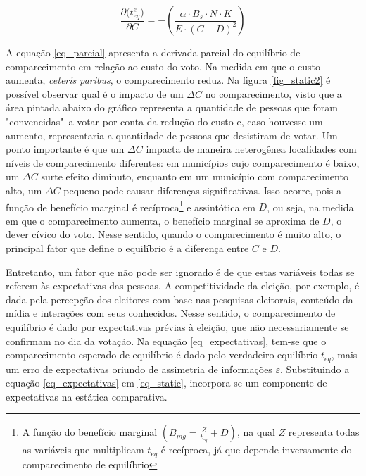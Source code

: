 % 
% 

\begin{equation}
\label{eq_parcial}
    \frac{\partial{(t_{eq}^e})}{\partial C} = -\left(\frac{\alpha\cdot B_s\cdot N\cdot K}{E\cdot (C-D)^2}\right)
\end{equation}

A equação \ref{eq_parcial} apresenta a derivada parcial do equilíbrio de comparecimento em relação ao custo do voto. Na medida em que o custo aumenta, \textit{ceteris paribus}, o comparecimento reduz. Na figura \ref{fig_static2} é possível observar qual é o impacto de um $\Delta C$ no comparecimento, visto que a área pintada abaixo do gráfico representa a quantidade de pessoas que foram "convencidas"\  a votar por conta da redução do custo e, caso houvesse um aumento, representaria a quantidade de pessoas que desistiram de votar. Um ponto importante é que um $\Delta C$ impacta de maneira heterogênea localidades com níveis de comparecimento diferentes: em municípios cujo comparecimento é baixo, um $\Delta C$ surte efeito diminuto, enquanto em um município com comparecimento alto, um $\Delta C$ pequeno pode causar diferenças significativas. Isso ocorre, pois a função de benefício marginal é recíproca\footnote{A função do benefício marginal $(B_{mg}=\frac{Z}{t_{eq}} + D)$, na qual $Z$ representa todas as variáveis que multiplicam $t_{eq}$ é recíproca, já que depende inversamente do comparecimento de equilíbrio} 
e assintótica em $D$, ou seja, na medida em que o comparecimento aumenta, o benefício marginal se aproxima de $D$, o dever cívico do voto. Nesse sentido, quando o comparecimento é muito alto, o principal fator que define o equilíbrio é a diferença entre $C$ e $D$.

Entretanto, um fator que não pode ser ignorado é de que estas variáveis todas se referem às expectativas das pessoas. A competitividade da eleição, por exemplo, é dada pela percepção dos eleitores com base nas pesquisas eleitorais, conteúdo da mídia e interações com seus conhecidos. Nesse sentido, o comparecimento de equilíbrio é dado por expectativas prévias à eleição, que não necessariamente se confirmam no dia da votação. Na equação \ref{eq_expectativas}, tem-se que o comparecimento esperado de equilíbrio é dado pelo verdadeiro equilíbrio $t_{eq}$, mais um erro de expectativas oriundo de assimetria de informações $\varepsilon$. Substituindo a equação \ref{eq_expectativas} em \ref{eq_static}, incorpora-se um componente de expectativas na estática comparativa.


